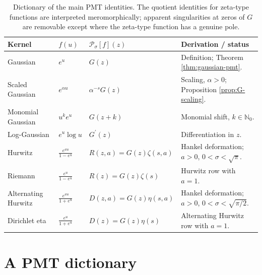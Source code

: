 \documentclass[12pt,english]{article}
\theoremstyle{plain} %
\theoremstyle{remark} %
\begin{document}
\begin{table}[hbt]
\centering
\small
\renewcommand{\arraystretch}{1.35}
\begin{tabularx}{\textwidth}{@{}p{3.4cm}p{1.9cm}p{3.9cm}X@{}}
\toprule
\textbf{Kernel} & $f(u)$ & $\mathcal{P}_{\sigma}[f](z)$ & \textbf{Derivation / status} \\
\midrule

Gaussian
& $e^u$
& $G(z)$
& Definition; Theorem \ref{thm:gaussian-pmt}. \\[2mm]

Scaled Gaussian
& $e^{\alpha u}$
& $\alpha^{-s}G(z)$
& Scaling, $\alpha>0$; Proposition \ref{prop:G-scaling}. \\[3mm]

Monomial Gaussian
& $u^k e^u$
& $G(z+k)$
& Monomial shift, $k\in\mathbb{N}_0$. \\[2mm]

Log-Gaussian
& $e^u\log u$
& $G^{\prime}(z)$
& Differentiation in $z$. \\[2mm]

Hurwitz
& $\displaystyle\frac{e^{au}}{1-e^u}$
& $R(z,a)=G(z)\zeta(s,a)$
& Hankel deformation; $a>0$, $0<\sigma<\sqrt{\pi}$. \\[3mm]

Riemann
& $\displaystyle\frac{e^u}{1-e^u}$
& $R(z)=G(z)\zeta(s)$
& Hurwitz row with $a=1$. \\[3mm]

Alternating Hurwitz
& $\displaystyle\frac{e^{au}}{1+e^u}$
& $D(z,a)=G(z)\eta(s,a)$
& Hankel deformation; $a>0$, $0<\sigma<\sqrt{\pi/2}$. \\[3mm]

Dirichlet eta
& $\displaystyle\frac{e^u}{1+e^u}$
& $D(z)=G(z)\eta(s)$
& Alternating Hurwitz row with $a=1$. \\

\bottomrule
\end{tabularx}
\caption{Dictionary of the main PMT identities. The quotient identities for
zeta-type functions are interpreted meromorphically; apparent singularities at
zeros of $G$ are removable except where the zeta-type function has a genuine
pole.}
\label{tab:pmt-dictionary}
\end{table}

\section{A PMT dictionary}
\label{sec:pmt-dictionary}
\end{document}
